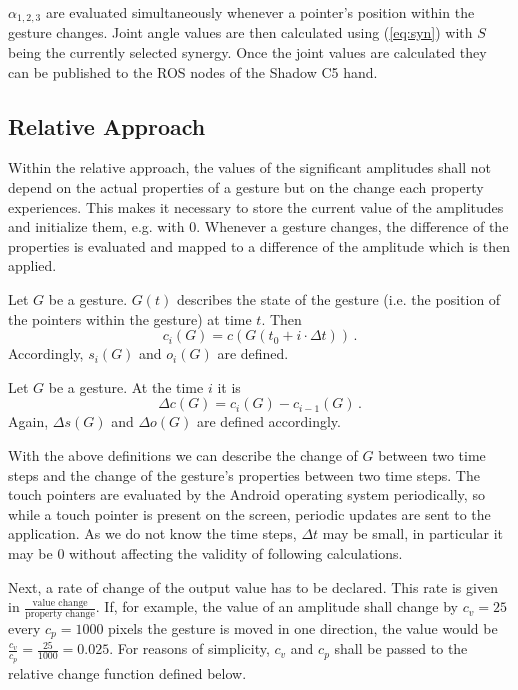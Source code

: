 $\alpha_{1,2,3}$ are evaluated simultaneously whenever a pointer's position within the gesture changes. Joint angle values are then calculated using (\ref{eq:syn}) with $S$ being the currently selected synergy. Once the joint values are calculated they can be published to the ROS nodes of the Shadow C5 hand.

\subsection{Relative Approach}
\label{sec:app:rel}
Within the relative approach, the values of the significant amplitudes shall not depend on the actual properties of a gesture but on the change each property experiences. This makes it necessary to store the current value of the amplitudes and initialize them, e.g. with 0. Whenever a gesture changes, the difference of the properties is evaluated and mapped to a difference of the amplitude which is then applied.

\begin{defn}
Let $G$ be a gesture. $G(t)$ describes the state of the gesture (i.e. the position of the pointers within the gesture) at time $t$. Then
\begin{equation}
c_i(G) = c(G(t_0 + i \cdot \Delta t)) \, .
\end{equation}
Accordingly, $s_i(G)$ and $o_i(G)$ are defined.
\end{defn}

\begin{defn}
Let $G$ be a gesture. At the time $i$ it is
\begin{equation}
\Delta c(G) = c_i(G) - c_{i - 1}(G) \, .
\end{equation}
Again, $\Delta s(G)$ and $\Delta o(G)$ are defined accordingly.
\end{defn}

With the above definitions we can describe the change of $G$ between two time steps and the change of the gesture's properties between two time steps. The touch pointers are evaluated by the Android operating system periodically, so while a touch pointer is present on the screen, periodic updates are sent to the application. As we do not know the time steps, $\Delta t$ may be small, in particular it may be $0$ without affecting the validity of following calculations.

Next, a rate of change of the output value has to be declared. This rate is given in $\frac{\text{value change}}{\text{property change}}$. If, for example, the value of an amplitude shall change by $c_v = 25$ every $c_p = 1000$ pixels the gesture is moved in one direction, the value would be $\frac{c_v}{c_p} = \frac{25}{1000} = 0.025$. For reasons of simplicity, $c_v$ and $c_p$ shall be passed to the relative change function defined below.

